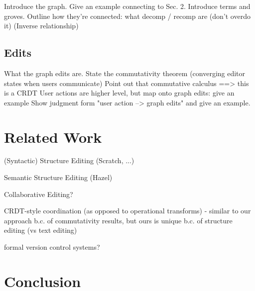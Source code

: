 \documentclass[nonacm, acmsmall, screen, review]{acmart}
\begin{document}
Introduce the graph. Give an example connecting to Sec. 2.
Introduce terms and groves.
Outline how they're connected: what decomp / recomp are (don't overdo it)
(Inverse relationship)

\subsection{Edits}
What the graph edits are.
State the commutativity theorem (converging editor states when users communicate)
Point out that commutative calculus ==> this is a CRDT
User actions are higher level, but map onto graph edits: give an example
Show judgment form "user action --> graph edits" and give an example.




\section{Related Work}
\label{sec:related-work}

% 

(Syntactic) Structure Editing (Scratch, ...)


Semantic Structure Editing (Hazel)

Collaborative Editing?

CRDT-style coordination (as opposed to operational transforms)
- similar to our approach b.c. of commutativity results, but ours is unique b.c. of structure editing (vs text editing)

formal version control systems?


\section{Conclusion}
\label{sec:conclusion}
\end{document}
